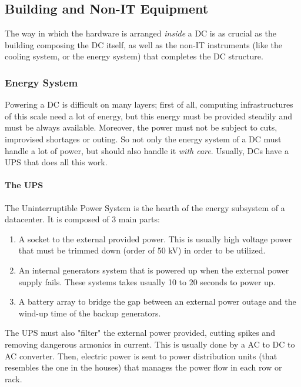 \documentclass{article}
\begin{document}
			\subsection{Building and Non-IT Equipment}
				The way in which the hardware is arranged \emph{inside} a DC is as crucial as the building composing the DC itself, as well as the non-IT instruments (like the cooling system, or the energy system) that completes the DC structure.\\
				
				\subsubsection{Energy System}
					Powering a DC is difficult on many layers; first of all, computing infrastructures of this scale need a lot of energy, but this energy must be provided steadily and must be always available. Moreover, the power must not be subject to cuts, improvised shortages or outing. So not only the energy system of a DC must handle a lot of power, but should also handle it \emph{with care}. Usually, DCs have a UPS that does all this work.
					
					\paragraph{The UPS}
						The Uninterruptible Power System is the hearth of the energy subsystem of a datacenter. It is composed of 3 main parts:
						\begin{enumerate}
							\item A socket to the external provided power. This is usually high voltage power that must be trimmed down (order of 50 kV) in order to be utilized.
							\item An internal generators system that is powered up when the external power supply fails. These systems takes usually 10 to 20 seconds to power up.
							\item A battery array to bridge the gap between an external power outage and the wind-up time of the backup generators.
						\end{enumerate}
						The UPS must also "filter" the external power provided, cutting spikes and removing dangerous armonics in current. This is usually done by a AC to DC to AC converter. Then, electric power is sent to power distribution units (that resembles the one in the houses) that manages the power flow in each row or rack.
				
\end{document}
